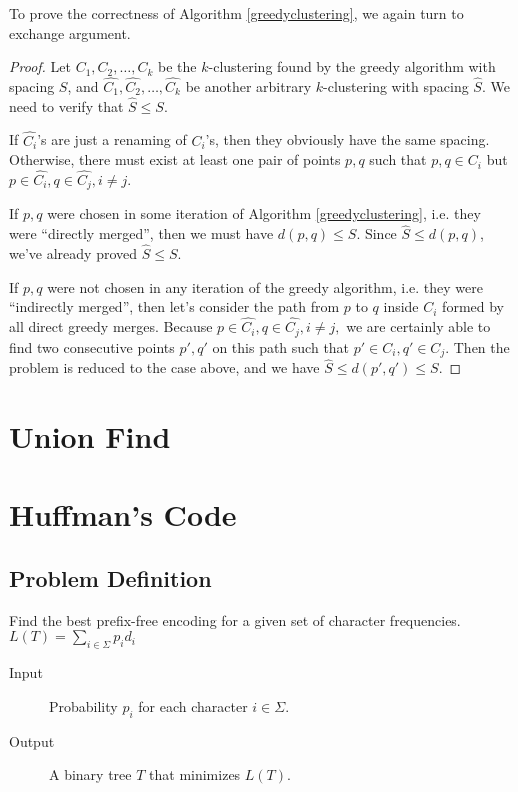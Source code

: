 To prove the correctness of Algorithm \ref{greedyclustering}, we again turn to exchange argument.
\begin{proof}
Let $C_1,C_2,\dots,C_k$ be the $k$-clustering found by the greedy algorithm with spacing $S$, and $\hat{C_1},\hat{C_2},\dots,\hat{C_k}$ be another arbitrary $k$-clustering with spacing $\hat{S}$. We need to verify that $\hat{S}\leq S$.

If $\hat{C_i}$'s are just a renaming of $C_i$'s, then they obviously have the same spacing. Otherwise, there must exist at least one pair of points $p,q$ such that $p,q\in C_i$ but $p\in \hat{C_i}, q\in\hat{C_j}, i\neq j.$

If $p,q$ were chosen in some iteration of Algorithm \ref{greedyclustering}, i.e. they were ``directly merged'', then we must have $d(p,q)\leq S$. Since $\hat{S}\leq d(p,q)$, we've already proved $\hat{S}\leq S$.

If $p,q$ were not chosen in any iteration of the greedy algorithm, i.e. they were ``indirectly merged'', then let's consider the path from $p$ to $q$ inside $C_i$ formed by all direct greedy merges. Because $p\in \hat{C_i}, q\in\hat{C_j}, i\neq j,$ we are certainly able to find two consecutive points $p',q'$ on this path such that $p'\in C_i, q'\in C_j$. Then the problem is reduced to the case above, and we have $\hat{S}\leq d(p',q')\leq S$.   
\end{proof}
\section{Union Find}
\section{Huffman's Code}
\subsection{Problem Definition}
Find the best prefix-free encoding for a given set of character frequencies. 
$L(T)=\sum\limits_{i\in\Sigma}p_id_i$
\begin{description}
\item[Input]Probability $p_i$ for each character $i\in\Sigma$.
\item[Output]A binary tree $T$ that minimizes $L(T).$
\end{description}

